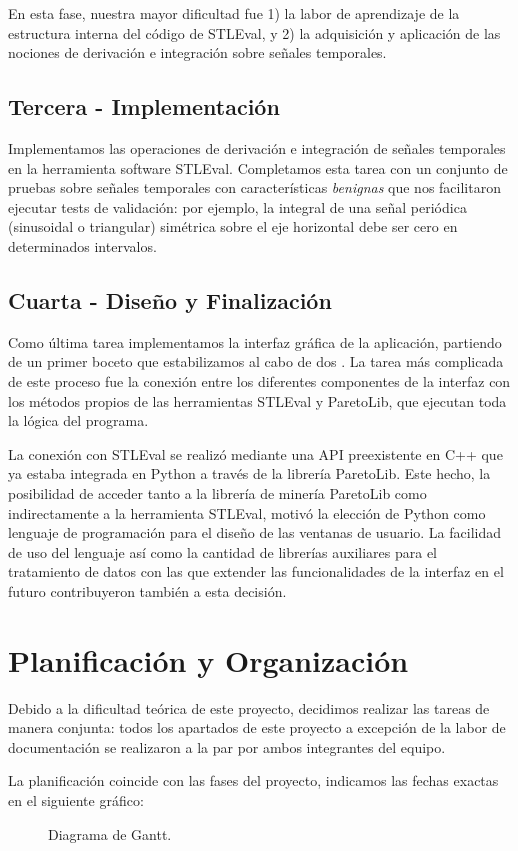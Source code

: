 	En esta fase, nuestra mayor dificultad fue 1) la labor de aprendizaje de la estructura interna del código de STLEval, y 2) la adquisición y aplicación de las nociones de derivación e integración sobre señales temporales.

\subsection{Tercera - Implementación}

	Implementamos las operaciones de derivación e integración de señales temporales en la herramienta software STLEval. Completamos esta tarea con un conjunto de pruebas sobre señales temporales con características \textit{benignas} que nos facilitaron ejecutar tests de validación: por ejemplo, la integral de una señal periódica (sinusoidal o triangular) simétrica sobre el eje horizontal debe ser cero en determinados intervalos.

\subsection{Cuarta - Diseño y Finalización}

	Como última tarea implementamos la interfaz gráfica de la aplicación, partiendo de un primer boceto que estabilizamos al cabo de dos . La tarea más complicada de este proceso fue la conexión entre los diferentes componentes de la interfaz con los métodos propios de las herramientas STLEval y ParetoLib, que ejecutan toda la lógica del programa.
	
	La conexión con STLEval se realizó mediante una API preexistente en C++ que ya estaba integrada en Python a través de la librería ParetoLib. Este hecho, la posibilidad de acceder tanto a la librería de minería ParetoLib como indirectamente a la herramienta STLEval, motivó la elección de Python como lenguaje de programación para el diseño de las ventanas de usuario. La facilidad de uso del lenguaje así como la cantidad de librerías auxiliares para el tratamiento de datos con las que extender las funcionalidades de la interfaz en el futuro contribuyeron también a esta decisión.
	


\section{Planificación y Organización}

Debido a la dificultad teórica de este proyecto, decidimos realizar las tareas de manera conjunta: todos los apartados de este proyecto a excepción de la labor de documentación se realizaron a la par por ambos integrantes del equipo. 

La planificación coincide con las fases del proyecto, indicamos las fechas exactas en el siguiente gráfico: 

\begin{figure}
\centering
\caption{Diagrama de Gantt.}
\label{fig:gant}
\end{figure}
